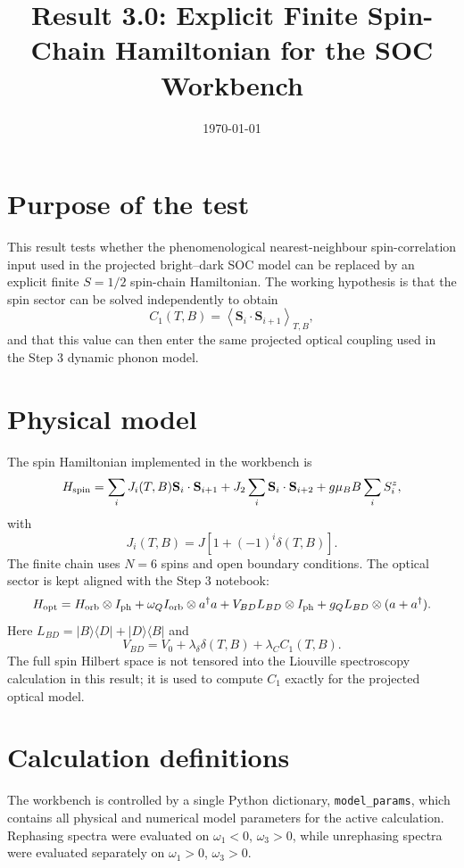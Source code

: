 \documentclass[11pt]{article}
\title{Result 3.0: Explicit Finite Spin-Chain Hamiltonian for the SOC Workbench}
\author{}
\date{\today}
\begin{document}
\maketitle

\section{Purpose of the test}
This result tests whether the phenomenological nearest-neighbour spin-correlation input used in the projected bright--dark SOC model can be replaced by an explicit finite $S=1/2$ spin-chain Hamiltonian. The working hypothesis is that the spin sector can be solved independently to obtain
\begin{equation}
C_1(T,B)=\left\langle \mathbf S_i\cdot\mathbf S_{i+1}\right\rangle_{T,B},
\end{equation}
and that this value can then enter the same projected optical coupling used in the Step 3 dynamic phonon model.

\section{Physical model}
The spin Hamiltonian implemented in the workbench is
\begin{equation}
H_{\rm spin}=\sum_i J_i(T,B)\mathbf S_i\cdot\mathbf S_{i+1}+J_2\sum_i\mathbf S_i\cdot\mathbf S_{i+2}+g\mu_B B\sum_i S_i^z,
\end{equation}
with
\begin{equation}
J_i(T,B)=J\left[1+(-1)^i\delta(T,B)\right].
\end{equation}
The finite chain uses $N=6$ spins and open boundary conditions. The optical sector is kept aligned with the Step 3 notebook:
\begin{equation}
H_{\rm opt}=H_{\rm orb}\otimes I_{\rm ph}+\omega_Q I_{\rm orb}\otimes a^\dagger a+V_{BD}L_{BD}\otimes I_{\rm ph}+g_Q L_{BD}\otimes(a+a^\dagger).
\end{equation}
Here $L_{BD}=|B\rangle\langle D|+|D\rangle\langle B|$ and
\begin{equation}
V_{BD}=V_0+\lambda_\delta\delta(T,B)+\lambda_C C_1(T,B).
\end{equation}
The full spin Hilbert space is not tensored into the Liouville spectroscopy calculation in this result; it is used to compute $C_1$ exactly for the projected optical model.

\section{Calculation definitions}
The workbench is controlled by a single Python dictionary, \verb|model_params|, which contains all physical and numerical model parameters for the active calculation. Rephasing spectra were evaluated on $\omega_1<0$, $\omega_3>0$, while unrephasing spectra were evaluated separately on $\omega_1>0$, $\omega_3>0$.
\end{document}
